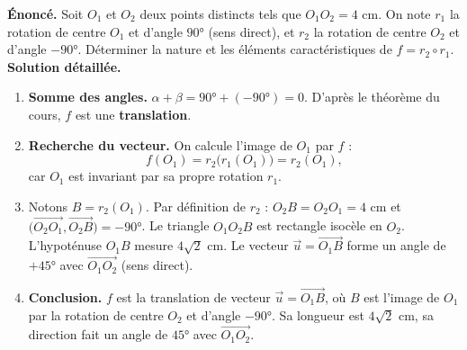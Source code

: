 \documentclass[11pt]{article}
\begin{document}
\begin{exoresolu}
\textbf{Énoncé.} Soit $O_1$ et $O_2$ deux points distincts tels que $O_1O_2 = 4$ cm. On note $r_1$ la rotation de centre $O_1$ et d'angle $90°$ (sens direct), et $r_2$ la rotation de centre $O_2$ et d'angle $-90°$. Déterminer la nature et les éléments caractéristiques de $f = r_2 \circ r_1$.
\tcblower
\textbf{Solution détaillée.}
\begin{enumerate}
\item \textbf{Somme des angles.} $\alpha + \beta = 90° + (-90°) = 0$. D'après le théorème du cours, $f$ est une \textbf{translation}.
\item \textbf{Recherche du vecteur.} On calcule l'image de $O_1$ par $f$ :
\[ f(O_1) = r_2\big(r_1(O_1)\big) = r_2(O_1), \]
car $O_1$ est invariant par sa propre rotation $r_1$.
\item Notons $B = r_2(O_1)$. Par définition de $r_2$ : $O_2B = O_2O_1 = 4$ cm et $\big(\overrightarrow{O_2O_1}, \overrightarrow{O_2B}\big) = -90°$.
Le triangle $O_1O_2B$ est rectangle isocèle en $O_2$. L'hypoténuse $O_1B$ mesure $4\sqrt{2}$ cm.
Le vecteur $\vec{u} = \overrightarrow{O_1B}$ forme un angle de $+45°$ avec $\overrightarrow{O_1O_2}$ (sens direct).
\item \textbf{Conclusion.} $f$ est la translation de vecteur $\vec{u} = \overrightarrow{O_1B}$, où $B$ est l'image de $O_1$ par la rotation de centre $O_2$ et d'angle $-90°$. Sa longueur est $4\sqrt{2}$ cm, sa direction fait un angle de $45°$ avec $\overrightarrow{O_1O_2}$.
\end{enumerate}
\end{exoresolu}
\end{document}
